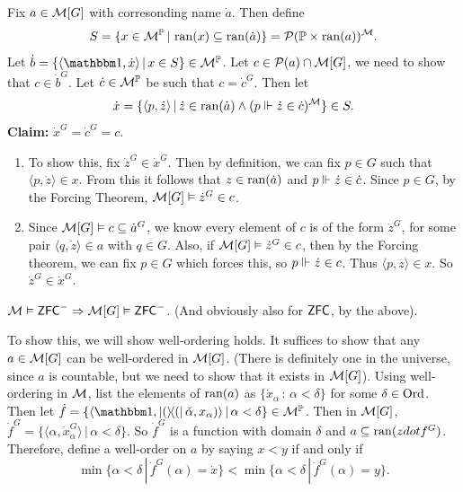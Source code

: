 \documentclass{article}
\begin{document}
    Fix $a \in \mathcal{M}[G]$ with corresonding name $\dot{a}$. Then define \[ S = \{ x \in \mathcal{M}^{\mathbb{P}} \, | \, \operatorname{ran}(x) \subseteq \operatorname{ran}(\dot{a})\} = \mathcal{P}(\mathbb{P} \times \operatorname{ran}(a))^{\mathcal{M}}.\]
    Let $\dot{b} = \{ \langle \bbone, \dot{x} \rangle \, | \, x \in S\} \in \calM^{\bbP}$. Let $c \in \mathcal{P}(a) \cap \mathcal{M}[G]$, we need to show that $c \in \dot{b}^{G}$. Let $\dot{c} \in \mathcal{M}^{\mathbb{P}}$ be such that $c = \dot{c}^{G}$. Then let \[ \dot{x} = \{ \langle p, \dot{z} \rangle \, | \, \dot{z} \in \operatorname{ran}(\dot{a}) \wedge (p \Vdash \dot{z} \in \dot{c})^{\mathcal{M}}\} \in S.\]
    \textbf{Claim:} $\dot{x}^{G} = \dot{c}^{G} = c$.
    \begin{enumerate}
        \item[($\dot{x}^{G} \subseteq c$)] To show this, fix $\dot{z}^{G} \in \dot{x}^{G}$. Then by definition, we can fix $p \in G$ such that $\langle p, \dot{z} \rangle \in x$. From this it follows that $z \in \operatorname{ran}(\dot{a})$ and $p \Vdash \dot{z} \in \dot{c}$. Since $p \in G$, by the Forcing Theorem, $\mathcal{M}[G] \vDash \dot{z}^{G} \in c$.
        \item[($c \subseteq \dot{x}^{G}$)] Since $\mathcal{M}[G] \vDash c \subseteq \dot{a}^{G}$, we know every element of $c$ is of the form $\dot{z}^{G}$, for some pair $\langle q, \dot{z}\rangle \in a$ with $q \in G$. Also, if $\mathcal{M}[G] \vDash \dot{z}^{G} \in c$, then by the Forcing theorem, we can fix $p \in G$ which forces this, so $p \Vdash \dot{z} \in c$. Thus $\langle p, z \rangle \in x$. So $\dot{z}^{G} \in \dot{x}^{G}$.
    \end{enumerate}
    \endproof
    \begin{fancylem}{}
        $\mathcal{M} \vDash \mathsf{ZFC}^{-} \Rightarrow \mathcal{M}[G] \vDash \mathsf{ZFC}^{-}$. (And obviously also for $\mathsf{ZFC}$, by the above).
    \end{fancylem}
    \proof To show this, we will show well-ordering holds. It suffices to show that any $a \in \mathcal{M}[G]$ can be well-ordered in $\mathcal{M}[G]$. (There is definitely one in the universe, since $a$ is countable, but we need to show that it exists in $\mathcal{M}[G]$). Using well-ordering in $\mathcal{M}$, list the elements of $\operatorname{ran}(a)$ as $\{ \dot{x}_{\alpha} \, : \, \alpha < \delta \}$ for some $\delta \in \operatorname{Ord}$. \gap
    Then let $\dot{f} = \{ \langle \bbone, \op(\check{\alpha},x_{\alpha}) \rangle \, | \, \alpha < \delta \} \in \calM^{\bbP}$. Then in $\mathcal{M}[G]$, $\dot{f}^{G} = \{ \langle \alpha, \dot{x}_{\alpha}^{G}\rangle \, | \, \alpha < \delta\}$. So $\dot{f}^{G}$ is a function with domain $\delta$ and $a \subseteq \operatorname{ran}(zdot{f}^{G})$. Therefore, define a well-order on $a$ by saying $x < y$ if and only if \[\min\{ \alpha < \delta \, | \, \dot{f}^{G}(\alpha) = \dot{x}\} < \min\{ \alpha < \delta \, | \, \dot{f}^{G}(\alpha) = y\}.\]
\end{document}
